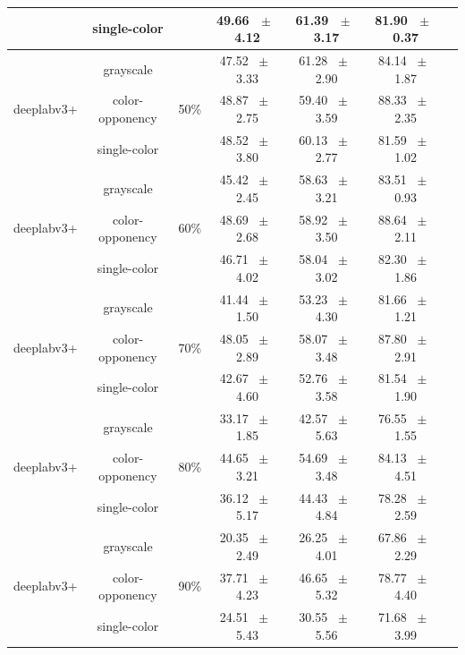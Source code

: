 \begin{table}[h]
\begin{tabular}{@{}lccc ccc@{}}
    & single-color &  & 49.66 ~$\pm$~ 4.12 & 61.39 ~$\pm$~ 3.17 & 81.90 ~$\pm$~ 0.37 \\
    \midrule
    \multirow{3}{*}{deeplabv3+} & grayscale & \multirow{3}{*}{50\%} & 47.52 ~$\pm$~ 3.33 & 61.28 ~$\pm$~ 2.90 & 84.14 ~$\pm$~ 1.87 \\
    & color-opponency &  & 48.87 ~$\pm$~ 2.75 & 59.40 ~$\pm$~ 3.59 & 88.33 ~$\pm$~ 2.35 \\
    & single-color &  & 48.52 ~$\pm$~ 3.80 & 60.13 ~$\pm$~ 2.77 & 81.59 ~$\pm$~ 1.02 \\
    \midrule
    \multirow{3}{*}{deeplabv3+} & grayscale & \multirow{3}{*}{60\%} & 45.42 ~$\pm$~ 2.45 & 58.63 ~$\pm$~ 3.21 & 83.51 ~$\pm$~ 0.93 \\
    & color-opponency &  & 48.69 ~$\pm$~ 2.68 & 58.92 ~$\pm$~ 3.50 & 88.64 ~$\pm$~ 2.11 \\
    & single-color &  & 46.71 ~$\pm$~ 4.02 & 58.04 ~$\pm$~ 3.02 & 82.30 ~$\pm$~ 1.86 \\
    \midrule
    \multirow{3}{*}{deeplabv3+} & grayscale & \multirow{3}{*}{70\%} & 41.44 ~$\pm$~ 1.50 & 53.23 ~$\pm$~ 4.30 & 81.66 ~$\pm$~ 1.21 \\
    & color-opponency &  & 48.05 ~$\pm$~ 2.89 & 58.07 ~$\pm$~ 3.48 & 87.80 ~$\pm$~ 2.91 \\
    & single-color &  & 42.67 ~$\pm$~ 4.60 & 52.76 ~$\pm$~ 3.58 & 81.54 ~$\pm$~ 1.90 \\
    \midrule
    \multirow{3}{*}{deeplabv3+} & grayscale & \multirow{3}{*}{80\%} & 33.17 ~$\pm$~ 1.85 & 42.57 ~$\pm$~ 5.63 & 76.55 ~$\pm$~ 1.55 \\
    & color-opponency &  & 44.65 ~$\pm$~ 3.21 & 54.69 ~$\pm$~ 3.48 & 84.13 ~$\pm$~ 4.51 \\
    & single-color &  & 36.12 ~$\pm$~ 5.17 & 44.43 ~$\pm$~ 4.84 & 78.28 ~$\pm$~ 2.59 \\
    \midrule
    \multirow{3}{*}{deeplabv3+} & grayscale & \multirow{3}{*}{90\%} & 20.35 ~$\pm$~ 2.49 & 26.25 ~$\pm$~ 4.01 & 67.86 ~$\pm$~ 2.29 \\
    & color-opponency &  & 37.71 ~$\pm$~ 4.23 & 46.65 ~$\pm$~ 5.32 & 78.77 ~$\pm$~ 4.40 \\
    & single-color &  & 24.51 ~$\pm$~ 5.43 & 30.55 ~$\pm$~ 5.56 & 71.68 ~$\pm$~ 3.99 \\
    \midrule
    \bottomrule
  \end{tabular}
  \label{tab:sparse_results_deeplabv3+_acdc_fog}
\end{table}